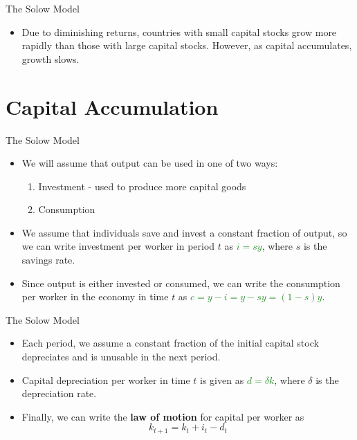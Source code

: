 \documentclass[xcolor={dvipsnames},pdf, hyperref={colorlinks=true, citecolor=ForestGreen, linkcolor=BlueViolet, urlcolor=Magenta}]{beamer}
\theoremstyle{definition}
\newcommand{\dd}[1]{{\underline{\textcolor{ForestGreen}{#1}}}}
\begin{document}
\begin{frame}{The Solow Model}

\begin{itemize}
	\item Due to diminishing returns, countries with small capital stocks grow more rapidly than those with large capital stocks. However, as capital accumulates, growth slows. 
\end{itemize}
\end{frame}

\section{Capital Accumulation}

\begin{frame}{The Solow Model}
\begin{itemize}
	\item We will assume that output can be used in one of two ways: 
	\begin{enumerate}
		\item Investment - used to produce more capital goods
		\item Consumption
	\end{enumerate}
	\item We assume that individuals save and invest a constant fraction of output, so we can write investment per worker in period $t$ as \dd{$i = sy$}, where $s$ is the savings rate.
	\item Since output is either invested or consumed, we can write the consumption per worker in the economy in time $t$ as \dd{$c = y - i = y - sy = (1-s)y$}.
\end{itemize}
\end{frame}

\begin{frame}{The Solow Model}
\begin{itemize}
	\item Each period, we assume a constant fraction of the initial capital stock depreciates and is unusable in the next period.
	\item Capital depreciation per worker in time $t$ is given as \dd{$d =\delta k$}, where $\delta$ is the depreciation rate.
	\item Finally, we can write the \textbf{law of motion} for capital per worker as \[k_{t+1} = k_t + i_t - d_t\]
\end{itemize}
\end{frame}
\end{document}
